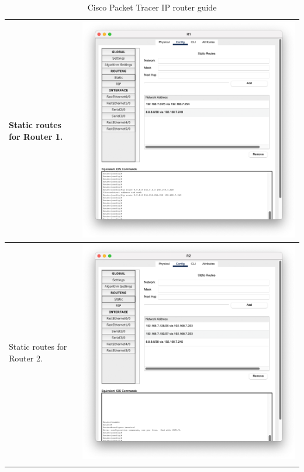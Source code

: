 \documentclass[11pt,a4paper]{report}
\begin{document}
\begin{flushleft}
\begin{center}
\begin{longtable}{ m{5cm} l }
                        Static routes for Router 1.     & \includegraphics[scale=0.35  ,valign=c]{r1-staticroute}                \\ \hline
                        Static routes for Router 2.     & \includegraphics[scale=0.35  ,valign=c]{r2-staticroute}                \\ \hline

                        \caption{Cisco Packet Tracer IP router guide}
                        \label{tab:cptg1.5}
                    \end{longtable}
                \end{center}
        \end{flushleft}
\end{document}
